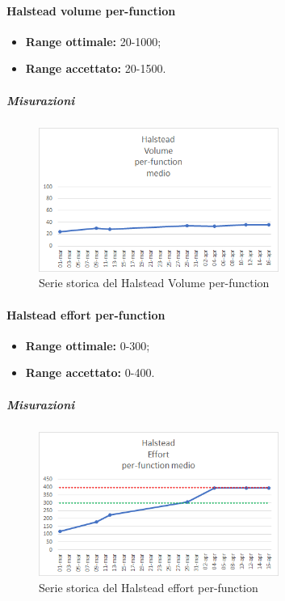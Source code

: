 			\paragraph{Halstead volume per-function} \Spazio
			\begin{itemize}
			\item \textbf{Range ottimale:} 20-1000;
			\item \textbf{Range accettato:} 20-1500.
			\end{itemize}
		    \subparagraph{Misurazioni}
		    \begin{figure}[H]
		    	\centering 
		    	\includegraphics[width=0.7\textwidth]{Images/H-volume.png}
		    	\caption{Serie storica del Halstead Volume per-function}
		    	\label{vol} 
		    \end{figure}
			\paragraph{Halstead effort per-function} \Spazio
			\begin{itemize}
				\item \textbf{Range ottimale:} 0-300;
				\item \textbf{Range accettato:} 0-400.
			\end{itemize}
		\subparagraph{Misurazioni}
		\begin{figure}[H]
			\centering 
			\includegraphics[width=0.7\textwidth]{Images/H-effort.png}
			\caption{Serie storica del Halstead effort per-function}
			\label{eff} 
		\end{figure}
